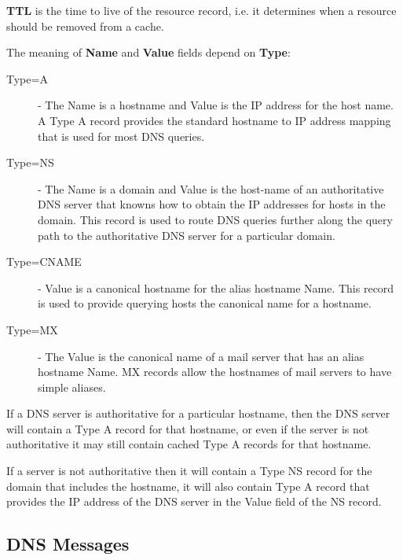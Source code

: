 \documentclass[12pt letter]{report}
\begin{document}
\textbf{TTL} is the time to live of the resource record, i.e. it
determines when a resource should be removed from a cache.

The meaning of \textbf{Name} and \textbf{Value} fields depend on \textbf{Type}:
\begin{description}
  \item[Type=A]  - The Name is a hostname and Value is the IP address
    for the host name. A Type A record provides the standard hostname
    to IP address mapping that is used for most DNS queries.
  \item[Type=NS] - The Name is a domain and Value is the host-name of
    an authoritative DNS server that knowns how to obtain the IP
    addresses for hosts in the domain. This record is used to route
    DNS queries further along the query path to the authoritative DNS
    server for a particular domain.
  \item[Type=CNAME] - Value is a canonical hostname for the alias
    hostname Name. This record is used to provide querying hosts the
    canonical name for a hostname.
  \item[Type=MX] - The Value is the canonical name of a mail server
    that has an alias hostname Name. MX records allow the hostnames
    of mail servers to have simple aliases.
\end{description}

If a DNS server is authoritative for a particular hostname, then the
DNS server will contain a Type A record for that hostname, or even if
the server is not authoritative it may still contain cached Type A
records for that hostname.

If a server is not authoritative then it will contain a Type NS
record for the domain that includes the hostname, it will also
contain Type A record that provides the IP address of the DNS server
in the Value field of the NS record.

\subsection{DNS Messages}
\end{document}
